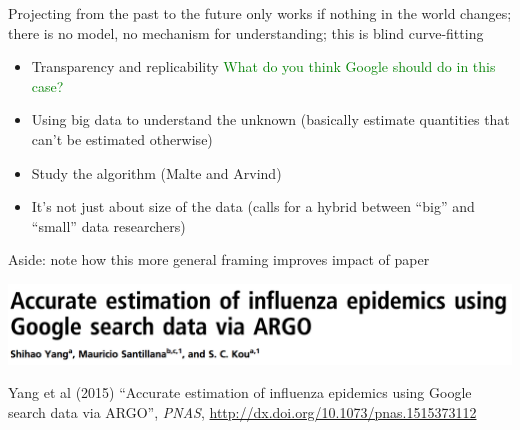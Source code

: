 \documentclass[aspectratio=169]{beamer}
\def\vf{\vfill}
\begin{document}
\begin{frame}

Projecting from the past to the future only works if nothing in the world changes; there is no model, no mechanism for understanding; this is blind curve-fitting

\end{frame}
\begin{frame}

\begin{itemize}
\item Transparency and replicability
\pause
\textcolor{green}{What do you think Google should do in this case?}
\item Using big data to understand the unknown (basically estimate quantities that can't be estimated otherwise)
\pause
\item Study the algorithm (Malte and Arvind)
\pause
\item It's not just about size of the data (calls for a hybrid between ``big'' and ``small'' data researchers)
\end{itemize}

\end{frame}
\begin{frame}

Aside: note how this more general framing improves impact of paper

\end{frame}
\begin{frame}

\begin{center}
\includegraphics[width=\textwidth]{figures/yang_accurate_2015_title}
\end{center}

\vf
Yang et al (2015) ``Accurate estimation of influenza epidemics using Google search data via ARGO'', \textit{PNAS}, \url{http://dx.doi.org/10.1073/pnas.1515373112}
\end{frame}
\end{document}
